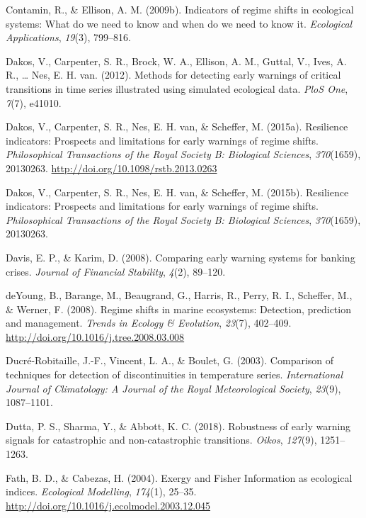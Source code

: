 \documentclass[12pt,twoside,openany]{reedthesis}
\begin{document}
\hypertarget{ref-contamin2009indicators}{}
Contamin, R., \& Ellison, A. M. (2009b). Indicators of regime shifts in
ecological systems: What do we need to know and when do we need to know
it. \emph{Ecological Applications}, \emph{19}(3), 799--816.

\hypertarget{ref-dakos_methods_2012}{}
Dakos, V., Carpenter, S. R., Brock, W. A., Ellison, A. M., Guttal, V.,
Ives, A. R., \ldots{} Nes, E. H. van. (2012). Methods for detecting
early warnings of critical transitions in time series illustrated using
simulated ecological data. \emph{PloS One}, \emph{7}(7), e41010.

\hypertarget{ref-dakos_resilience_2015}{}
Dakos, V., Carpenter, S. R., Nes, E. H. van, \& Scheffer, M. (2015a).
Resilience indicators: Prospects and limitations for early warnings of
regime shifts. \emph{Philosophical Transactions of the Royal Society B:
Biological Sciences}, \emph{370}(1659), 20130263.
\url{http://doi.org/10.1098/rstb.2013.0263}

\hypertarget{ref-dakos2015resilience}{}
Dakos, V., Carpenter, S. R., Nes, E. H. van, \& Scheffer, M. (2015b).
Resilience indicators: Prospects and limitations for early warnings of
regime shifts. \emph{Philosophical Transactions of the Royal Society B:
Biological Sciences}, \emph{370}(1659), 20130263.

\hypertarget{ref-davis_comparing_2008}{}
Davis, E. P., \& Karim, D. (2008). Comparing early warning systems for
banking crises. \emph{Journal of Financial Stability}, \emph{4}(2),
89--120.

\hypertarget{ref-deyoung_regime_2008}{}
deYoung, B., Barange, M., Beaugrand, G., Harris, R., Perry, R. I.,
Scheffer, M., \& Werner, F. (2008). Regime shifts in marine ecosystems:
Detection, prediction and management. \emph{Trends in Ecology \&
Evolution}, \emph{23}(7), 402--409.
\url{http://doi.org/10.1016/j.tree.2008.03.008}

\hypertarget{ref-ducre2003comparison}{}
Ducré-Robitaille, J.-F., Vincent, L. A., \& Boulet, G. (2003).
Comparison of techniques for detection of discontinuities in temperature
series. \emph{International Journal of Climatology: A Journal of the
Royal Meteorological Society}, \emph{23}(9), 1087--1101.

\hypertarget{ref-dutta2018robustness}{}
Dutta, P. S., Sharma, Y., \& Abbott, K. C. (2018). Robustness of early
warning signals for catastrophic and non-catastrophic transitions.
\emph{Oikos}, \emph{127}(9), 1251--1263.

\hypertarget{ref-fath_exergy_2004}{}
Fath, B. D., \& Cabezas, H. (2004). Exergy and Fisher Information as
ecological indices. \emph{Ecological Modelling}, \emph{174}(1), 25--35.
\url{http://doi.org/10.1016/j.ecolmodel.2003.12.045}
\end{document}
